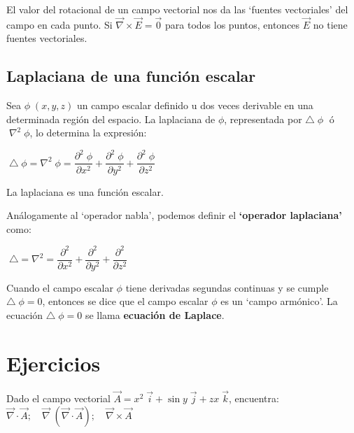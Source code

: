 El valor del rotacional de un campo vectorial nos da las `fuentes vectoriales' del campo en cada punto. Si $\overrightarrow{\nabla} \times \overrightarrow {E}=\overrightarrow{0}$ para todos los puntos, entonces $\overrightarrow{E}$ no tiene fuentes vectoriales.

\subsection{Laplaciana de una función escalar}

Sea $\phi \; (x,y,z)$ un campo escalar definido u dos veces derivable en una determinada región del espacio. La laplaciana de $\phi$, representada por $\triangle\; \phi \;$ ó $\; \nabla^2 \; \phi$, lo determina la expresión:

\vspace{4mm}\centerline{$\boxed{\;\triangle\; \phi= \nabla^2 \; \phi =  \dfrac{\partial^2\; \phi}{\partial x^2}+\dfrac{\partial^2\; \phi}{\partial y^2}+\dfrac{\partial^2\; \phi}{\partial z^2} \;}$}

\vspace{3mm} La laplaciana es una función escalar.

Análogamente al `operador nabla', podemos definir el \textbf{`operador laplaciana'} como:


\vspace{4mm}\centerline{$\boxed {\;	\triangle = \nabla^2 = \dfrac {\partial^2}{\partial x^2}+ \dfrac {\partial^2}{\partial y^2}+\dfrac {\partial^2}{\partial z^2} \; }$}

Cuando el campo escalar $\phi$ tiene derivadas segundas continuas y se cumple $\triangle \; \phi = 0$, entonces se dice que el campo escalar $\phi$ es un `campo armónico'. La ecuación  $\triangle \; \phi = 0$ se llama \textbf{ecuación de Laplace}.


\section{Ejercicios}

\begin{ejre}
Dado el campo vectorial $\overrightarrow A =x^2 \; \vec i + \sin y \; \vec j + zx \; \vec k$, encuentra: $\overrightarrow {\nabla} \cdot \overrightarrow A; \quad \overrightarrow \nabla \; (\overrightarrow {\nabla} \cdot \overrightarrow A); \quad \overrightarrow {\nabla} \times \overrightarrow A$	
\end{ejre}

